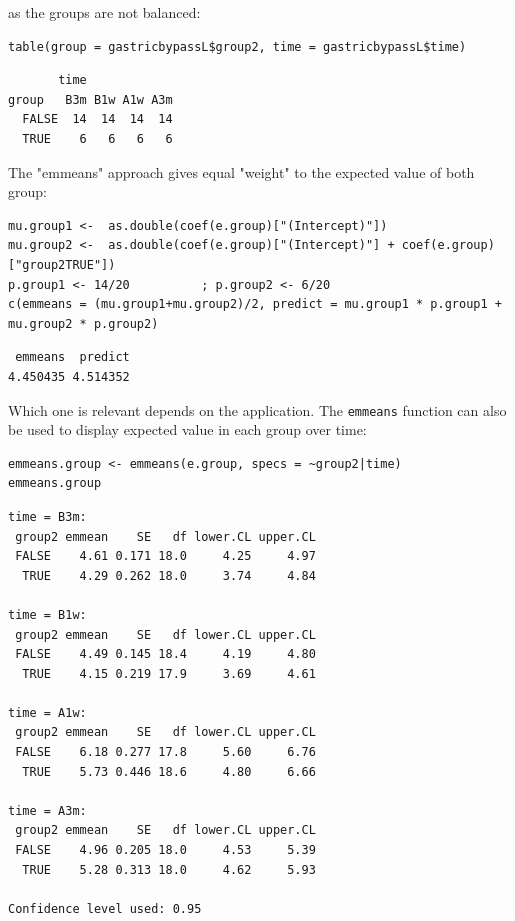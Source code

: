 \documentclass[12pt]{article}
\begin{document}
as the groups are not balanced:
\lstset{language=r,label= ,caption= ,captionpos=b,numbers=none}
\begin{lstlisting}
table(group = gastricbypassL$group2, time = gastricbypassL$time)
\end{lstlisting}

\begin{verbatim}
       time
group   B3m B1w A1w A3m
  FALSE  14  14  14  14
  TRUE    6   6   6   6
\end{verbatim}


The "emmeans" approach gives equal "weight" to the expected value of
both group:
\lstset{language=r,label= ,caption= ,captionpos=b,numbers=none}
\begin{lstlisting}
mu.group1 <-  as.double(coef(e.group)["(Intercept)"])
mu.group2 <-  as.double(coef(e.group)["(Intercept)"] + coef(e.group)["group2TRUE"])
p.group1 <- 14/20          ; p.group2 <- 6/20
c(emmeans = (mu.group1+mu.group2)/2, predict = mu.group1 * p.group1 + mu.group2 * p.group2)
\end{lstlisting}

\begin{verbatim}
 emmeans  predict 
4.450435 4.514352
\end{verbatim}


Which one is relevant depends on the application. The \texttt{emmeans}
function can also be used to display expected value in each group over
time:
\lstset{language=r,label= ,caption= ,captionpos=b,numbers=none}
\begin{lstlisting}
emmeans.group <- emmeans(e.group, specs = ~group2|time)
emmeans.group
\end{lstlisting}

\begin{verbatim}
time = B3m:
 group2 emmean    SE   df lower.CL upper.CL
 FALSE    4.61 0.171 18.0     4.25     4.97
  TRUE    4.29 0.262 18.0     3.74     4.84

time = B1w:
 group2 emmean    SE   df lower.CL upper.CL
 FALSE    4.49 0.145 18.4     4.19     4.80
  TRUE    4.15 0.219 17.9     3.69     4.61

time = A1w:
 group2 emmean    SE   df lower.CL upper.CL
 FALSE    6.18 0.277 17.8     5.60     6.76
  TRUE    5.73 0.446 18.6     4.80     6.66

time = A3m:
 group2 emmean    SE   df lower.CL upper.CL
 FALSE    4.96 0.205 18.0     4.53     5.39
  TRUE    5.28 0.313 18.0     4.62     5.93

Confidence level used: 0.95
\end{verbatim}
\end{document}
